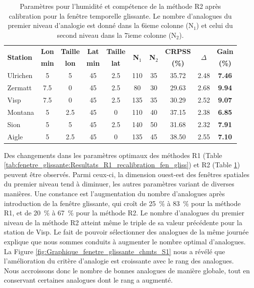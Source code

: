 \documentclass[hess]{copernicus}
\begin{document}
\begin{table}[htb]
	\caption{Paramètres pour l'humidité et compétence de la méthode R2 après calibration pour la fenêtre temporelle glissante. Le nombre d'analogues du premier niveau d'analogie est donné dans la 6ieme colonne (N$_{1}$) et celui du second niveau dans la 7ieme colonne (N$_{2}$).}
	\begin{center}
		\begin{tabular}{l c c c c c c c c c }
			\hline
			\multirow{2}{*}{\textbf{Station}} & \textbf{Lon} & \textbf{Taille} & \textbf{Lat} & \textbf{Taille} & \multirow{2}{*}{\textbf{N$_{1}$}} & \multirow{2}{*}{\textbf{N$_{2}$}} & \textbf{CRPSS} &  \multirow{2}{*}{\textbf{$\Delta$}} & \textbf{Gain}\\ 
			& \textbf{min} & \textbf{lon} & \textbf{min} & \textbf{lat} &  &  & \textbf{(\%)} & & \textbf{(\%)} \\ 
			\hline
			Ulrichen & 5 & 5 & 45 & 2.5 & 110 & 35 & 35.72 & 2.48 & \textbf{7.46} \\ \hline
			Zermatt & 7.5 & 0 & 45 & 2.5 & 80 & 30 & 29.63 & 2.68 & \textbf{9.94} \\ \hline
			Visp & 7.5 & 0 & 45 & 2.5 & 135 & 35 & 30.29 & 2.52 & \textbf{9.07} \\ \hline
			Montana & 5 & 2.5 & 45 & 0 & 110 & 40 & 37.15 & 2.38 & \textbf{6.85} \\ \hline
			Sion & 5 & 5 & 45 & 2.5 & 140 & 50 & 31.68 & 2.32 & \textbf{7.91} \\ \hline
			Aigle & 5 & 2.5 & 45 & 0 & 135 & 45 & 38.50 & 2.55 & \textbf{7.10} \\ \hline
		\end{tabular}
	\end{center}
	\label{tab:fenetre_glissante:Resultats_R2_recalibration_fen_gliss}
\end{table}

Des changements dans les paramètres optimaux des méthodes R1 (Table \ref{tab:fenetre_glissante:Resultats_R1_recalibration_fen_gliss}) et R2 (Table \ref{tab:fenetre_glissante:Resultats_R2_recalibration_fen_gliss}) peuvent être observés. Parmi ceux-ci, la dimension ouest-est des fenêtres spatiales du premier niveau tend à diminuer, les autres paramètres variant de diverses manières. Une constance est l'augmentation du nombre d'analogues après introduction de la fenêtre glissante, qui croît de 25~\% à 83~\% pour la méthode R1, et de 20~\% à 67~\% pour la méthode R2. Le nombre d'analogues du premier niveau de la méthode R2 atteint même le triple de sa valeur précédente pour la station de Visp. Le fait de pouvoir sélectionner des analogues de la même journée explique que nous sommes conduits à augmenter le nombre optimal d'analogues. La Figure \ref{fig:Graphique_fenetre_glissante_chmts_S1} nous a révélé que l'amélioration du critère d'analogie est croissante avec le rang des analogues. Nous accroissons donc le nombre de bonnes analogues de manière globale, tout en conservant certaines analogues dont le rang a augmenté.
\end{document}
